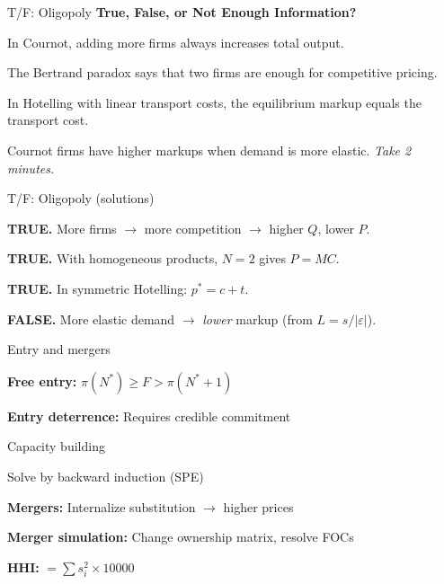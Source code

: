 \documentclass[notes,11pt, aspectratio=169]{beamer}
\newenvironment{wideitemize}{\itemize\addtolength{\itemsep}{10pt}}{\enditemize}
\newenvironment{wideenumerate}{\enumerate\addtolength{\itemsep}{10pt}}{\endenumerate}
\begin{document}
\begin{frame}{T/F: Oligopoly}
	\textbf{True, False, or Not Enough Information?}
	\vspace{8pt}
	\begin{wideenumerate}
		\item In Cournot, adding more firms always increases total output.
		\item The Bertrand paradox says that two firms are enough for competitive pricing.
		\item In Hotelling with linear transport costs, the equilibrium markup equals the transport cost.
		\item Cournot firms have higher markups when demand is more elastic.
	\end{wideenumerate}
	\vspace{8pt}
	\centering
	\textit{Take 2 minutes.}
\end{frame}

\begin{frame}{T/F: Oligopoly (solutions)}
	\begin{wideenumerate}
		\item \textbf{TRUE.} More firms $\rightarrow$ more competition $\rightarrow$ higher $Q$, lower $P$.
		\item \textbf{TRUE.} With homogeneous products, $N=2$ gives $P=MC$.
		\item \textbf{TRUE.} In symmetric Hotelling: $p^* = c + t$.
		\item \textbf{FALSE.} More elastic demand $\rightarrow$ \textit{lower} markup (from $L = s/|\varepsilon|$).
	\end{wideenumerate}
\end{frame}

\begin{frame}{Entry and mergers}
	\begin{wideitemize}
		\item \textbf{Free entry:} $\pi(N^*) \geq F > \pi(N^* + 1)$
		\item \textbf{Entry deterrence:} Requires credible commitment
		\begin{wideitemize}
			\vspace{3pt}
			\item Capacity building
			\item Solve by backward induction (SPE)
		\end{wideitemize}
		\item \textbf{Mergers:} Internalize substitution $\rightarrow$ higher prices
		\item \textbf{Merger simulation:} Change ownership matrix, resolve FOCs
		\item \textbf{HHI:} $= \sum s_i^2 \times 10000$
	\end{wideitemize}
\end{frame}
\end{document}
